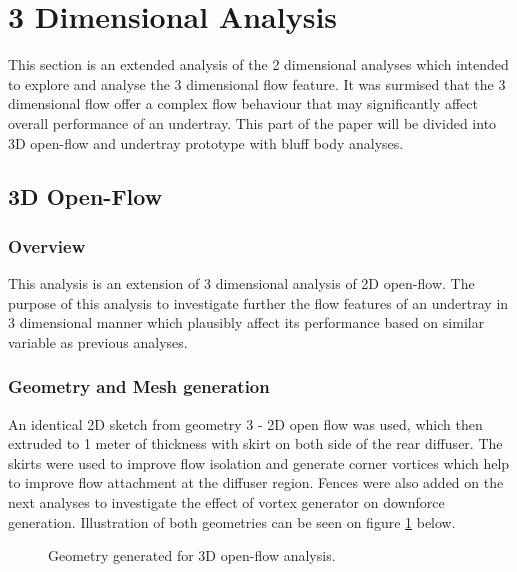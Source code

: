 \newpage
\section{3 Dimensional Analysis}
\noindent This section is an extended analysis of the 2 dimensional analyses which intended to explore and analyse the 3 dimensional flow feature. It was surmised that the 3 dimensional flow offer a complex flow behaviour that may significantly affect overall performance of an undertray. This part of the paper will be divided into 3D open-flow and undertray prototype with bluff body analyses.


\subsection{3D Open-Flow}
\subsubsection{Overview}
This analysis is an extension of 3 dimensional analysis of 2D open-flow. The purpose of this analysis to investigate further the flow features of an undertray in 3 dimensional manner which plausibly affect its performance based on similar variable as previous analyses.

\subsubsection{Geometry and Mesh generation}
An identical 2D sketch from geometry 3 - 2D open flow was used, which then extruded to 1 meter of thickness with skirt on both side of the rear diffuser. The skirts were used to improve flow isolation  and generate corner vortices which help to improve flow attachment at the diffuser region. Fences were also added on the next analyses to investigate the effect of vortex generator on downforce generation. Illustration of both geometries can be seen on figure \ref{fig:3D_OF_GEOM} below.  

\begin{figure}[!h]
    \centering
    \noindent{}
    \caption{Geometry generated for 3D open-flow analysis.}
    \label{fig:3D_OF_GEOM}
\end{figure}

